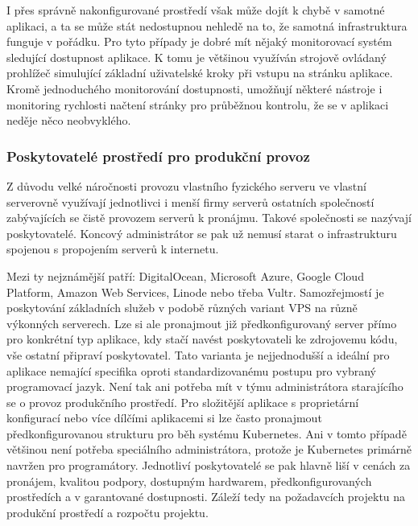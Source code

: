 		I přes správně nakonfigurované prostředí však může dojít k chybě v samotné aplikaci, a ta se může stát nedostupnou
		nehledě na to, že samotná infrastruktura funguje v pořádku.
		Pro tyto případy je dobré mít nějaký monitorovací systém sledující dostupnost aplikace.
		K tomu je většinou využíván strojově ovládaný prohlížeč simulující základní uživatelské kroky při vstupu na stránku
		aplikace.
		Kromě jednoduchého monitorování dostupnosti, umožňují některé nástroje i monitoring rychlosti načtení stránky pro
		průběžnou kontrolu, že se v aplikaci neděje něco neobvyklého.

		\subsubsection{Poskytovatelé prostředí pro produkční provoz}

		Z důvodu velké náročnosti provozu vlastního fyzického serveru ve vlastní serverovně využívají jednotlivci i menší firmy
		serverů ostatních společností zabývajících se čistě provozem serverů k pronájmu.
		Takové společnosti se nazývají poskytovatelé.
		Koncový administrátor se pak už nemusí starat o infrastrukturu spojenou s propojením serverů k internetu.

		Mezi ty nejznámější patří: DigitalOcean, Microsoft Azure, Google Cloud Platform, Amazon Web Services,
		Linode nebo třeba Vultr.
		Samozřejmostí je poskytování základních služeb v podobě různých variant \Ac{VPS} na různě výkonných serverech.
		Lze si ale pronajmout již předkonfigurovaný server přímo pro konkrétní typ aplikace, kdy stačí navést poskytovateli
		ke zdrojovemu kódu, vše ostatní připraví poskytovatel.
		Tato varianta je nejjednodušší a ideální pro aplikace nemající specifika oproti standardizovanému postupu
		pro vybraný programovací jazyk.
		Není tak ani potřeba mít v týmu administrátora starajícího se o provoz produkčního prostředí.
		Pro složitější aplikace s proprietární konfigurací nebo více dílčími aplikacemi si lze často pronajmout
		předkonfigurovanou strukturu pro běh systému Kubernetes.
		Ani v tomto případě většinou není potřeba speciálního administrátora, protože je Kubernetes primárně navržen
		pro programátory.
		Jednotliví poskytovatelé se pak hlavně liší v cenách za pronájem, kvalitou podpory, dostupným hardwarem, předkonfigurovaných
		prostředích a v garantované dostupnosti.
		Záleží tedy na požadavcích projektu na produkční prostředí a rozpočtu projektu.

